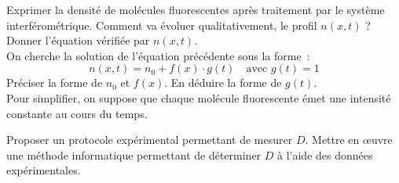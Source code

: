 \documentclass[a4paper,twoside,11pt]{article}
\begin{document}
\qt Exprimer la densité de molécules fluorescentes après traitement par le système interférométrique. Comment va évoluer qualitativement, le profil $n(x,t)$ ?
\qt Donner l'équation  vérifiée par $n(x,t)$.\\
On cherche la solution de l'équation précédente sous la forme~:
$$
n(x,t)=n_0+f(x)\cdot  g(t)\quad \text{avec $g(t)=1$}
$$
\qt Préciser la forme de $n_0$ et $f(x)$. En déduire la forme de $g(t)$.\\

Pour simplifier, on suppose que chaque molécule fluorescente émet une intensité constante au cours du temps.

\qt Proposer un protocole expérimental permettant de mesurer $D$.
\qt Mettre en \oe uvre une méthode informatique permettant de déterminer $D$ à l'aide des données expérimentales. 
\end{document}
